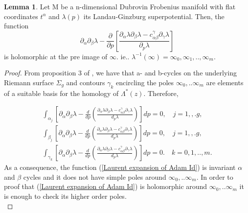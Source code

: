 \documentclass{article}
\theoremstyle{definition}
\newtheorem{lemma}[theorem]{Lemma}
\begin{document}
\begin{lemma}\label{Auxiliar lemma 2 Laurent Taylor}
 Let M be a n-dimensional Dubrovin Frobenius manifold with flat coordinates $t^{\alpha}$  and $\lambda(p)$ its Landau-Ginzburg superpotential. Then, the function
  \begin{equation}\label{Laurent expansion of Adam Id}
\partial_{\alpha}\partial_{\beta}\lambda-\frac{\partial}{\partial p}\left[ \frac{ \partial_{\alpha}\lambda \partial_{\beta}\lambda-c_{\alpha\beta}^{\gamma}\partial_{\gamma}\lambda}{ \partial_{p}\lambda}  \right]
\end{equation}
 is holomorphic at the pre image of $\infty$. ie.. $\lambda^{-1}(\infty)=\infty_0,\infty_1,..,\infty_m$.

\end{lemma}

\begin{proof}
From proposition 3 of \cite{V. Shramchenko 1}, we have that a- and b-cycles on the underlying  Riemann surface $\Sigma_g$ and contours $\gamma_k$ encircling the poles $\infty_0,..\infty_m$ are elements of a suitable basis for the homology of $\Lambda^{*}(z)$. Therefore,

\begin{equation}\label{Adam identity part 12}
\begin{split}
\int_{\alpha_j}\left[ \partial_{\alpha}\partial_{\beta}\lambda - \frac{d}{dp}\left(\frac{\partial_{\alpha}\lambda\partial_{\beta}\lambda-c_{\alpha\beta}^{\gamma}\partial_{\gamma}\lambda}{d_p\lambda}\right)\right]dp=0,\quad j=1,,.g,\\
\int_{\beta_j}\left[ \partial_{\alpha}\partial_{\beta}\lambda - \frac{d}{dp}\left(\frac{\partial_{\alpha}\lambda\partial_{\beta}\lambda-c_{\alpha\beta}^{\gamma}\partial_{\gamma}\lambda}{d_p\lambda}\right)\right]dp=0,\quad j=1,,.g,\\
\int_{\gamma_k}\left[ \partial_{\alpha}\partial_{\beta}\lambda - \frac{d}{dp}\left(\frac{\partial_{\alpha}\lambda\partial_{\beta}\lambda-c_{\alpha\beta}^{\gamma}\partial_{\gamma}\lambda}{d_p\lambda}\right)\right]dp=0.\quad k=0,1,..,m.
\end{split}
\end{equation}
As a consequence, the function  (\ref{Laurent expansion of Adam Id}) is invariant $\alpha$ and $\beta$ cycles and it does not have simple poles around $\infty_0,..\infty_m$. In order to proof that   (\ref{Laurent expansion of Adam Id})  is holomorphic around $\infty_0,..\infty_m$ it is enough to check its higher order poles.\\



\end{proof}
\end{document}
